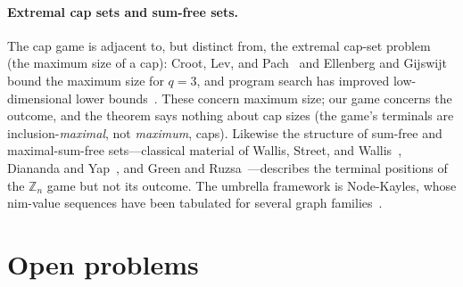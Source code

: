 \documentclass[11pt]{article}
\theoremstyle{plain}
\theoremstyle{definition}
\theoremstyle{remark}
\newcommand{\Zn}[1]{\mathbb{Z}_{#1}}
\begin{document}
\paragraph{Extremal cap sets and sum-free sets.} The cap game is adjacent to, but distinct from, the
extremal cap-set problem (the maximum size of a cap): Croot, Lev, and
Pach~\cite{croot2017progression} and Ellenberg and Gijswijt~\cite{ellenberg2017capset} bound the
maximum size for $q=3$, and program search has improved low-dimensional lower
bounds~\cite{romeraparedes2024funsearch}. These concern maximum size; our game concerns the outcome,
and the theorem says nothing about cap sizes (the game's terminals are inclusion-\emph{maximal}, not
\emph{maximum}, caps). Likewise the structure of sum-free and maximal-sum-free sets---classical
material of Wallis, Street, and Wallis~\cite{wallis1972combinatorics}, Diananda and
Yap~\cite{diananda1969maximal}, and Green and Ruzsa~\cite{green2005sumfree}---describes the terminal
positions of the $\Zn{n}$ game but not its outcome. The umbrella framework is Node-Kayles, whose
nim-value sequences have been tabulated for several graph families~\cite{wong2024nimber}.

\section{Open problems}
\label{sec:open}
\end{document}
